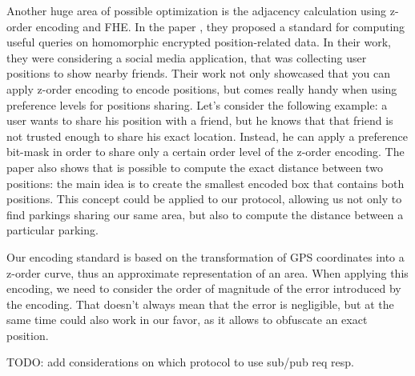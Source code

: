 Another huge area of possible optimization is the adjacency calculation using z-order encoding and FHE. In the paper \cite{zhang2020privacy}, they proposed a standard for computing useful queries on homomorphic encrypted position-related data. In their work, they were considering a social media application, that was collecting user positions to show nearby friends. Their work not only showcased that you can apply z-order encoding to encode positions, but comes really handy when using preference levels for positions sharing. Let's consider the following example: a user wants to share his position with a friend, but he knows that that friend is not trusted enough to share his exact location. Instead, he can apply a preference bit-mask in order to share only a certain order level of the z-order encoding. The paper also shows that is possible to compute the exact distance between two positions: the main idea is to create the smallest encoded box that contains both positions. This concept could be applied to our protocol, allowing us not only to find parkings sharing our same area, but also to compute the distance between a particular parking.


Our encoding standard is based on the transformation of GPS coordinates into a z-order curve, thus an approximate representation of an area. When applying this encoding, we need to consider the order of magnitude of the error introduced by the encoding. That doesn't always mean that the error is negligible, but at the same time could also work in our favor, as it allows to obfuscate an exact position.

TODO: add considerations on which protocol to use sub/pub req resp.
